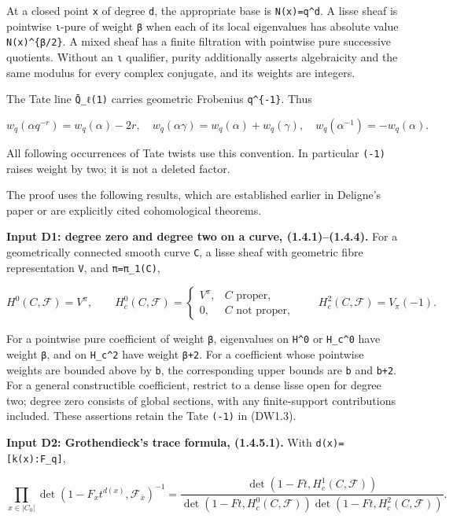 \documentclass[
]{report}
\begin{document}
At a closed point \texttt{x} of degree \texttt{d}, the appropriate base
is \texttt{N(x)=q\^{}d}. A lisse sheaf is pointwise \texttt{ι}-pure of
weight \texttt{β} when each of its local eigenvalues has absolute value
\texttt{N(x)\^{}\{β/2\}}. A mixed sheaf has a finite filtration with
pointwise pure successive quotients. Without an \texttt{ι} qualifier,
purity additionally asserts algebraicity and the same modulus for every
complex conjugate, and its weights are integers.

The Tate line \texttt{Q̄\_ℓ(1)} carries geometric Frobenius
\texttt{q\^{}\{-1\}}. Thus

\[
w_q(\alpha q^{-r})=w_q(\alpha)-2r,
\quad
w_q(\alpha\gamma)=w_q(\alpha)+w_q(\gamma),
\quad
w_q(\alpha^{-1})=-w_q(\alpha).
\tag{DW1.2}
\]

All following occurrences of Tate twists use this convention. In
particular \texttt{(-1)} raises weight by two; it is not a deleted
factor.

The proof uses the following results, which are established earlier in
Deligne's paper or are explicitly cited cohomological theorems.

\textbf{Input D1: degree zero and degree two on a curve,
(1.4.1)--(1.4.4).} For a geometrically connected smooth curve
\texttt{C}, a lisse sheaf with geometric fibre representation
\texttt{V}, and \texttt{π=π\_1(C)},

\[
H^0(C,\mathcal F)=V^{\pi},\qquad
H_c^0(C,\mathcal F)=
\begin{cases}V^{\pi},&C\text{ proper},\\0,&C\text{ not proper},\end{cases}
\qquad H_c^2(C,\mathcal F)=V_{\pi}(-1).
\tag{DW1.3}
\]

For a pointwise pure coefficient of weight \texttt{β}, eigenvalues on
\texttt{H\^{}0} or \texttt{H\_c\^{}0} have weight \texttt{β}, and on
\texttt{H\_c\^{}2} have weight \texttt{β+2}. For a coefficient whose
pointwise weights are bounded above by \texttt{b}, the corresponding
upper bounds are \texttt{b} and \texttt{b+2}. For a general
constructible coefficient, restrict to a dense lisse open for degree
two; degree zero consists of global sections, with any finite-support
contributions included. These assertions retain the Tate \texttt{(-1)}
in (DW1.3).

\textbf{Input D2: Grothendieck's trace formula, (1.4.5.1).} With
\texttt{d(x)={[}k(x):F\_q{]}},

\[
\prod_{x\in|C_0|}
\det(1-F_xt^{d(x)},\mathcal F_{\bar x})^{-1}
=
\frac{\det(1-Ft,H_c^1(C,\mathcal F))}
{\det(1-Ft,H_c^0(C,\mathcal F))
 \det(1-Ft,H_c^2(C,\mathcal F))}.
\tag{DW1.4}
\]
\end{document}
